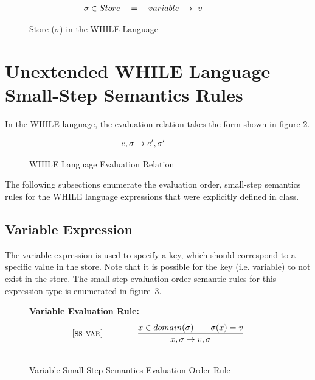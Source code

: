 \documentclass{article}
\begin{document}
\begin{figure}[H]
\caption{Store ($\sigma$) in the WHILE Language}
\label{fig:sigma}
\[
\\
\begin{array}{r@{\qquad\qquad}l}
  \sigma \in {Store} \quad  = \quad {variable} ~\rightarrow ~v
\end{array}
\]
\end{figure}

\section{Unextended WHILE Language Small-Step Semantics Rules}

In the WHILE language, the evaluation relation takes the form shown in figure \ref{fig:whileRelation}.

\begin{figure}[H]
\caption{WHILE Language Evaluation Relation}
\label{fig:whileRelation}
\[
\\
\begin{array}{r@{\qquad\qquad}l}
  \sstep{e}{\sigma}{e'}{\sigma'} \\
\end{array}
\]
\end{figure}

The following subsections enumerate the evaluation order, small-step semantics rules for the WHILE language expressions that were explicitly defined in class.  

\subsection{Variable Expression}

The variable expression is used to specify a key, which should correspond to a specific value in the store.  Note that it is possible for the key (i.e. variable) to not exist in the store.  The small-step evaluation order semantic rules for this expression type is enumerated in figure~\ref{fig:varRules}.

\begin{figure}[H]
\caption{Variable Small-Step Semantics Evaluation Order Rule}
\label{fig:varRules}
{\bf Variable Evaluation Rule:}
\[
\\
\begin{array}{r@{\qquad\qquad}l}
\ssrule{ss-var}{
  x \in domain(\sigma) \qquad \sigma(x)=v
}{
  \sstep{x}{\sigma}{v}{\sigma}
}
\end{array}
\]
\end{figure}
\end{document}
